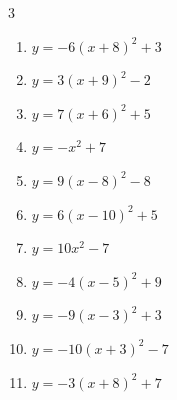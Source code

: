 \begin{multicols}{3}
\begin{enumerate}
        \phantom{$\displaystyle 頂点\left( 5 , 8 \right)$}

  \item $\displaystyle y=-6\left( x+8\right)^{2}+3$

        \phantom{$\displaystyle 頂点\left( -8 , 3 \right)$}

  \item $\displaystyle y=3\left( x+9\right)^{2}-2$

        \phantom{$\displaystyle 頂点\left( -9 , -2 \right)$}

  \item $\displaystyle y=7\left( x+6\right)^{2}+5$

        \phantom{$\displaystyle 頂点\left( -6 , 5 \right)$}

  \item $\displaystyle y=-x^{2}+7$

        \phantom{$\displaystyle 頂点\left( 0 , 7 \right)$}

  \item $\displaystyle y=9\left( x-8\right)^{2}-8$

        \phantom{$\displaystyle 頂点\left( 8 , -8 \right)$}

\columnbreak %

  \item $\displaystyle y=6\left( x-10\right)^{2}+5$

        \phantom{$\displaystyle 頂点\left( 10 , 5 \right)$}

  \item $\displaystyle y=10x^{2}-7$

        \phantom{$\displaystyle 頂点\left( 0 , -7 \right)$}

  \item $\displaystyle y=-4\left( x-5\right)^{2}+9$

        \phantom{$\displaystyle 頂点\left( 5 , 9 \right)$}

  \item $\displaystyle y=-9\left( x-3\right)^{2}+3$

        \phantom{$\displaystyle 頂点\left( 3 , 3 \right)$}

  \item $\displaystyle y=-10\left( x+3\right)^{2}-7$

        \phantom{$\displaystyle 頂点\left( -3 , -7 \right)$}

  \item $\displaystyle y=-3\left( x+8\right)^{2}+7$

        \phantom{$\displaystyle 頂点\left( -8 , 7 \right)$}


\end{enumerate}
\end{multicols}
